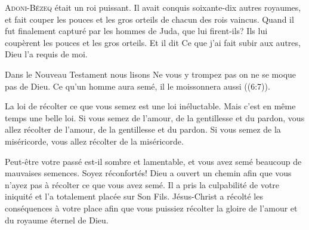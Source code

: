 



\lettrine{A}{doni-Bézeq} était un roi puissant.
 Il avait conquis soixante-dix autres royaumes, et fait couper les pouces
 et les gros orteils de chacun des rois vaincus.
 Quand il fut finalement capturé par les hommes de Juda, que lui firent-ils?
 Ils lui coupèrent les pouces et les gros orteils.
 Et il dit\frcolon{} \Og Ce que j'ai fait subir aux autres, Dieu l'a requis de moi. \Fg{}

Dans le Nouveau Testament nous lisons\frcolon{}
 \Og Ne vous y trompez pas\frcolon{} on ne se moque pas de Dieu.
 Ce qu'un homme aura semé, il le moissonnera aussi \Fg{} ((6:7)).


La loi de récolter ce que vous semez est une loi inéluctable.
 Mais c'est en même temps une belle loi.
 Si vous semez de l'amour, de la gentillesse et du pardon,
 vous allez récolter de l'amour, de la gentillesse et du pardon.
 Si vous semez de la miséricorde, vous allez récolter de la miséricorde.

Peut-être votre passé est-il sombre et lamentable,
 et vous avez semé beaucoup de mauvaises semences.
 Soyez réconfortés!
 Dieu a ouvert un chemin afin que vous n'ayez pas à récolter
 ce que vous avez semé.
 Il a pris la culpabilité de votre iniquité et l'a totalement placée
 sur Son Fils.
 Jésus-Christ a récolté les conséquences à votre place
 \ocadr afin que vous puissiez récolter la gloire de l'amour
 et du royaume éternel de Dieu. 

\dvrule



